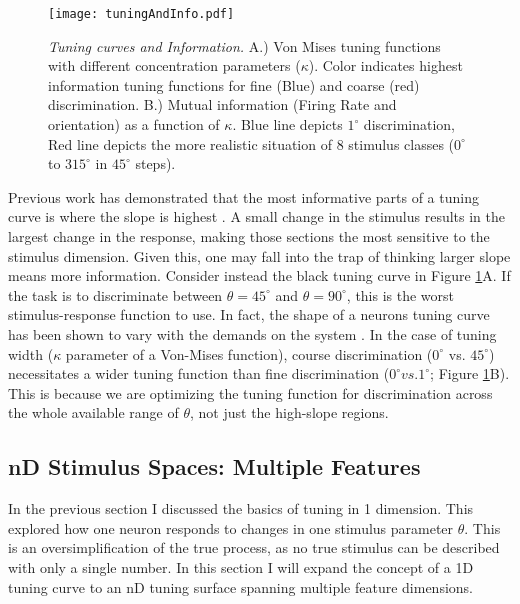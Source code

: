\begin{figure}[h]
	\centerline{\texttt{[image: tuningAndInfo.pdf]}}
	\caption{\textit{Tuning curves and Information.} A.) Von Mises tuning functions with different concentration parameters ($\kappa$). Color indicates highest information tuning functions for fine (Blue) and coarse (red) discrimination. B.) Mutual information (Firing Rate and orientation) as a function of $\kappa$. Blue line depicts $1^\circ$ discrimination, Red line depicts the more realistic situation of 8 stimulus classes ($0^\circ$ to $315^\circ$ in $45^\circ$ steps). }
	\label{fig:tuningInfo}
\end{figure}

Previous work has demonstrated that the most informative parts of a tuning curve is where the slope is highest \parencite{Series2004}. A small change in the stimulus results in the largest change in the response, making those sections the most sensitive to the stimulus dimension. Given this, one may fall into the trap of thinking larger slope means more information. Consider instead the black tuning curve in Figure \ref{fig:tuningInfo}A. If the task is to discriminate between $\theta=45^\circ$ and $\theta=90^\circ$, this is the worst stimulus-response function to use. In fact, the shape of a neurons tuning curve has been shown to vary with the demands on the system \parencite{Scott2023}. In the case of tuning width ($\kappa$ parameter of a Von-Mises function), course discrimination ($0^\circ$ vs. $45^\circ$) necessitates a wider tuning function than fine discrimination ($0^\circ vs. 1^\circ$; Figure \ref{fig:tuningInfo}B). This is because we are optimizing the tuning function for discrimination across the whole available range of $\theta$, not just the high-slope regions. 



\subsection{nD Stimulus Spaces: Multiple Features}
In the previous section I discussed the basics of tuning in 1 dimension. This explored how one neuron responds to changes in one stimulus parameter $\theta$. This is an oversimplification of the true process, as no true stimulus can be described with only a single number. In this section I will expand the concept of a 1D tuning curve to an nD tuning surface spanning multiple feature dimensions. 

